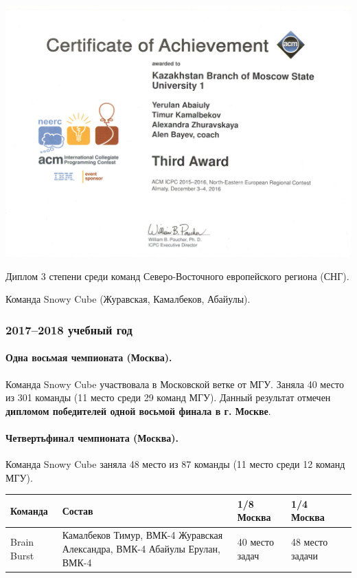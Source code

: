 \newpage
\mbox{}
\vfill
\begin{center}
\includegraphics[width=0.9\linewidth]{diploma/2016-almaty}

Диплом 3 степени среди команд Северо-Восточного европейского региона (СНГ).

Команда Snowy Cube (Журавская, Камалбеков, Абайулы).
\end{center}
\vfill
\mbox{}
\newpage

\subsubsection*{2017--2018 учебный год}

\paragraph{Одна восьмая чемпионата (Москва).} Команда Snowy Cube участвовала в Московской ветке от МГУ. Заняла 40 место из 301 команды (11 место среди 29 команд МГУ). Данный результат отмечен \textbf{дипломом победителей одной восьмой финала в г. Москве}.

\paragraph{Четвертьфинал чемпионата (Москва).} Команда Snowy Cube заняла 48 место из 87 команды (11 место среди 12 команд МГУ).

\begin{center}
\begin{tabular}{|p{1.8cm}|p{5.8cm}|p{1.5cm}|p{1.6cm}|l|}
\hline
Команда & Состав & 1/8 \newline Москва & 1/4 \newline Москва \\
\hline
Brain \newline Burst &
Камалбеков Тимур, ВМК-4 \newline
Журавская Александра, ВМК-4 \newline
Абайулы Ерулан, ВМК-4 
&
40 место \newline
8 задач
&
48 место \newline
3 задачи
\\
\hline
\end{tabular}
\end{center}

